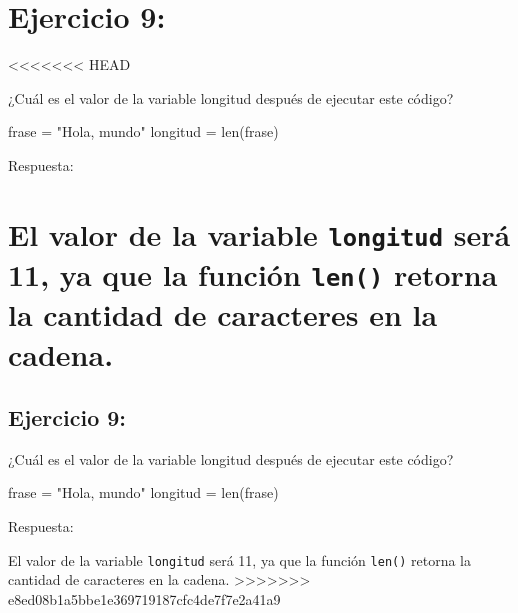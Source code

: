 \documentclass[
  a4paper,
  DIV=11,
  numbers=noendperiod,
  onepage,
  openany]{scrreprt}
\newenvironment{Shaded}{\begin{snugshade}}{\end{snugshade}}
\newcommand{\BuiltInTok}[1]{\textcolor[rgb]{0.00,0.23,0.31}{#1}}
\newcommand{\NormalTok}[1]{\textcolor[rgb]{0.00,0.23,0.31}{#1}}
\newcommand{\OperatorTok}[1]{\textcolor[rgb]{0.37,0.37,0.37}{#1}}
\newcommand{\StringTok}[1]{\textcolor[rgb]{0.13,0.47,0.30}{#1}}
\begin{document}
\hypertarget{ejercicio-9}{%
\chapter{Ejercicio 9:}\label{ejercicio-9}}

\textless\textless\textless\textless\textless\textless\textless{} HEAD

¿Cuál es el valor de la variable longitud después de ejecutar este
código?

\begin{Shaded}
\begin{Highlighting}[]
\NormalTok{frase }\OperatorTok{=} \StringTok{"Hola, mundo"}
\NormalTok{longitud }\OperatorTok{=} \BuiltInTok{len}\NormalTok{(frase)}
\end{Highlighting}
\end{Shaded}

Respuesta:

\hypertarget{el-valor-de-la-variable-longitud-seruxe1-11-ya-que-la-funciuxf3n-len-retorna-la-cantidad-de-caracteres-en-la-cadena.}{%
\chapter{\texorpdfstring{El valor de la variable \texttt{longitud} será
11, ya que la función \texttt{len()} retorna la cantidad de caracteres
en la
cadena.}{El valor de la variable longitud será 11, ya que la función len() retorna la cantidad de caracteres en la cadena.}}\label{el-valor-de-la-variable-longitud-seruxe1-11-ya-que-la-funciuxf3n-len-retorna-la-cantidad-de-caracteres-en-la-cadena.}}

\hypertarget{ejercicio-9-1}{%
\section{Ejercicio 9:}\label{ejercicio-9-1}}

¿Cuál es el valor de la variable longitud después de ejecutar este
código?

\begin{Shaded}
\begin{Highlighting}[]
\NormalTok{frase }\OperatorTok{=} \StringTok{"Hola, mundo"}
\NormalTok{longitud }\OperatorTok{=} \BuiltInTok{len}\NormalTok{(frase)}
\end{Highlighting}
\end{Shaded}

Respuesta:

El valor de la variable \texttt{longitud} será 11, ya que la función
\texttt{len()} retorna la cantidad de caracteres en la cadena.
\textgreater\textgreater\textgreater\textgreater\textgreater\textgreater\textgreater{}
e8ed08b1a5bbe1e369719187cfc4de7f7e2a41a9
\end{document}
